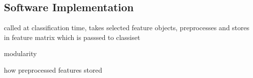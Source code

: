     \subsection{Software Implementation}
    \label{subsec:pl-featpreproc-software}
        \begin{sitemize}
            \item{called at classification time, takes selected feature objects, preprocesses and stores in feature matrix which is passsed to classiset}
            \item{modularity}
            \item{how preprocessed features stored}
        \end{sitemize}
    